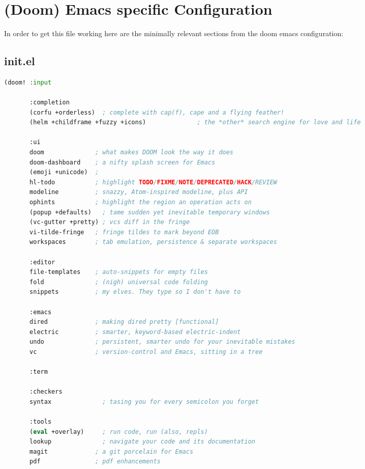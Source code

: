 \documentclass[a4paper,oneside,toc=bibliography,toc=listof]{scrbook}
\newenvironment{widemargin}{
\begin{center}
\begin{adjustwidth}{-1.5cm}{-1.5cm}
}{
\end{adjustwidth}
\end{center}
}
\begin{document}
\chapter{(Doom) Emacs specific Configuration}
\label{sec:orgd0a10ad}
In order to get this file working here are the minimally relevant sections from the doom emacs configuration:
\section{init.el}
\label{sec:org2d8626b}

\begin{widemargin}
\begin{lstlisting}[language=Lisp,numbers=none]
(doom! :input

       :completion
       (corfu +orderless)  ; complete with cap(f), cape and a flying feather!
       (helm +childframe +fuzzy +icons)              ; the *other* search engine for love and life

       :ui
       doom              ; what makes DOOM look the way it does
       doom-dashboard    ; a nifty splash screen for Emacs
       (emoji +unicode)  ; 
       hl-todo           ; highlight TODO/FIXME/NOTE/DEPRECATED/HACK/REVIEW
       modeline          ; snazzy, Atom-inspired modeline, plus API
       ophints           ; highlight the region an operation acts on
       (popup +defaults)   ; tame sudden yet inevitable temporary windows
       (vc-gutter +pretty) ; vcs diff in the fringe
       vi-tilde-fringe   ; fringe tildes to mark beyond EOB
       workspaces        ; tab emulation, persistence & separate workspaces

       :editor
       file-templates    ; auto-snippets for empty files
       fold              ; (nigh) universal code folding
       snippets          ; my elves. They type so I don't have to

       :emacs
       dired             ; making dired pretty [functional]
       electric          ; smarter, keyword-based electric-indent
       undo              ; persistent, smarter undo for your inevitable mistakes
       vc                ; version-control and Emacs, sitting in a tree

       :term

       :checkers
       syntax              ; tasing you for every semicolon you forget

       :tools
       (eval +overlay)     ; run code, run (also, repls)
       lookup              ; navigate your code and its documentation
       magit             ; a git porcelain for Emacs
       pdf               ; pdf enhancements


\end{lstlisting}
\end{widemargin}
\end{document}
